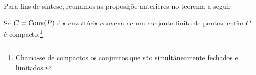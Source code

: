 Para fins de síntese, reunamos as proposiçõe anteriores no teorema a seguir

\begin{thm:conjuntos convexos compactos}
  Se $C = \mathrm{Conv}(P)$ é a envoltória convexa de um conjunto finito de pontos,
  então $C$ é compacto.\footnote{Chama-se de compactos os conjuntos que são
  simultâneamente fechados e limitados.}
\end{thm:conjuntos convexos compactos}
